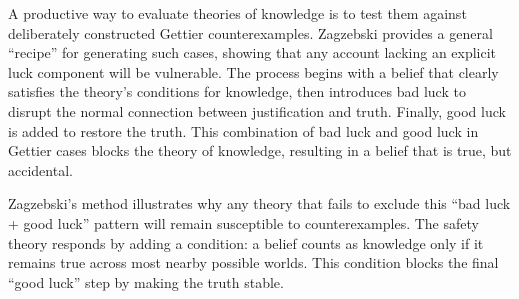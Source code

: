 \documentclass[12pt, a4paper, twoside]{article}
\begin{document}
A productive way to evaluate theories of knowledge is to test them against deliberately constructed Gettier counterexamples. Zagzebski provides a general “recipe” for generating such cases, showing that any account lacking an explicit luck component will be vulnerable. The process begins with a belief that clearly satisfies the theory’s conditions for knowledge, then introduces bad luck to disrupt the normal connection between justification and truth. Finally, good luck is added to restore the truth. This combination of bad luck and good luck in Gettier cases blocks the theory of knowledge, resulting in a belief that is true, but accidental.

Zagzebski’s method illustrates why any theory that fails to exclude this “bad luck + good luck” pattern will remain susceptible to counterexamples. The safety theory responds by adding a condition: a belief counts as knowledge only if it remains true across most nearby possible worlds. This condition blocks the final “good luck” step by making the truth stable.




\printbibliography
\end{document}
